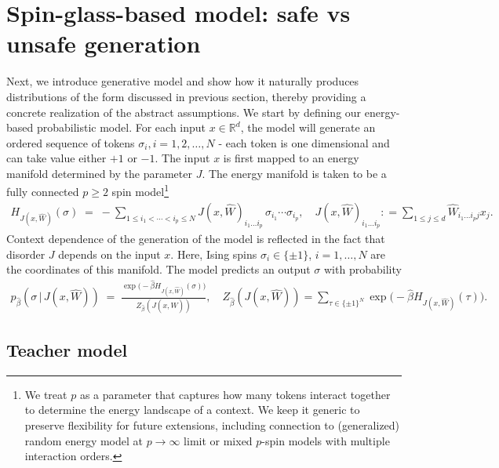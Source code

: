 \documentclass{article}
\theoremstyle{remark} %
\begin{document}
\section{Spin-glass-based model: safe vs unsafe generation}

Next, we introduce generative model and show how it naturally
produces distributions of the form discussed in previous section, thereby providing a concrete realization of the abstract assumptions. We start by defining our energy-based probabilistic model.
For each input  $x\in\mathbb{R}^d$, the model will generate an ordered sequence of tokens $\sigma_i, i=1,2, \dots, N$ - each token is one dimensional and can take value either $+1$ or $-1$. The input $x$ is first mapped to an energy manifold determined by the parameter $ J$. The energy manifold is taken to be a fully connected $p\geq 2$ spin model\footnote{We treat $p$ as a parameter that captures how many tokens interact together to determine the energy landscape of a context. We keep it generic to preserve flexibility for future extensions, including connection to (generalized) random energy model at $p\to \infty$ limit or mixed $p$-spin models with multiple interaction orders. } 
\begin{align}\label{eq:ham}
    H_{J(x,\hat W)}(\sigma)\;=\;-\!\!\sum_{1\le i_1< \cdots < i_p \le N}
J(x,\hat W)_{i_1\ldots i_p}\,\sigma_{i_1}\cdots\sigma_{i_p}, 
\quad 
J(x,\hat W)_{i_1\ldots i_p}: =\sum_{1\leq j \leq d}\hat W_{i_1\ldots i_p j}x_{j}.
\end{align}
Context dependence of the generation of the model is reflected in the fact that disorder $J$ depends on the input $x$. 
Here, Ising spins $\sigma_i\in\{\pm1\}$, $i=1,\dots,N$ are the coordinates of this manifold. 
The model predicts an output $\sigma$ with probability
\begin{align}\label{eq:sampling_probability}
p_{\hat \beta}(\sigma\,|\,J(x,\hat W))\;=\;\frac{\exp\!\big(-{\hat \beta} H_{J(x,\hat W)}(\sigma)\big)}{Z_{\hat \beta}(J(x,\hat W))},
\quad
Z_{\hat \beta}(J(x,\hat W))=\sum_{\tau\in\{\pm1\}^N} \exp\!\big(-{\hat \beta} H_{J(x,\hat W)}(\tau)\big).
\end{align}








\subsection{Teacher model}
\end{document}
